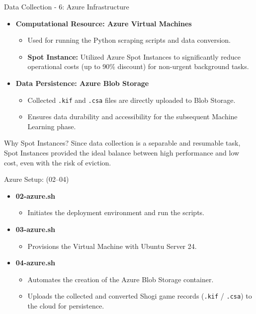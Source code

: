 \documentclass[aspectratio=169]{beamer}
\begin{document}
\begin{frame}{Data Collection - 6: Azure Infrastructure}
    \begin{itemize}
        \item \textbf{Computational Resource: Azure Virtual Machines}
        \begin{itemize}
            \item Used for running the Python scraping scripts and data conversion.
            \item \textbf{Spot Instance:} Utilized Azure Spot Instances to significantly reduce operational costs (up to 90\% discount) for non-urgent background tasks.
        \end{itemize}
        
        \item \textbf{Data Persistence: Azure Blob Storage}
        \begin{itemize}
            \item Collected \texttt{.kif} and \texttt{.csa} files are directly uploaded to Blob Storage.
            \item Ensures data durability and accessibility for the subsequent Machine Learning phase.
        \end{itemize}
    \end{itemize}

    \begin{block}{Why Spot Instances?}
        Since data collection is a separable and resumable task, Spot Instances provided the ideal balance between high performance and low cost, even with the risk of eviction.
    \end{block}
\end{frame} 


\begin{frame}{Azure Setup: (02--04)}
    \begin{itemize}
        \item \textbf{02-azure.sh}
            \begin{itemize}
                \item Initiates the deployment environment and run the scripts.
            \end{itemize}
        \item \textbf{03-azure.sh}
            \begin{itemize}
                \item Provisions the Virtual Machine with Ubuntu Server 24.
            \end{itemize}
        \item \textbf{04-azure.sh}
            \begin{itemize}
                \item Automates the creation of the Azure Blob Storage container.
                \item Uploads the collected and converted Shogi game records (\texttt{.kif} / \texttt{.csa}) to the cloud for persistence.
            \end{itemize}
    \end{itemize}
\end{frame}
\end{document}
